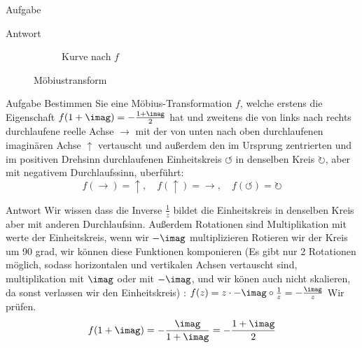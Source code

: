 \documentclass{scrartcl}
\let\*\cdot
\begin{document}
\begin{section}{Aufgabe}
\begin{subsection}{Antwort}
\begin{itemize}
\begin{figure}[H]
\begin{subfigure}{.47\textwidth}
\begin{tikzpicture}[x=2cm,y=2cm]
\end{tikzpicture}
  \caption{Kurve nach $f$}
\end{subfigure}
\caption{Möbiustransform}
\end{figure}





\end{itemize}
\end{subsection}
\end{section}
\begin{section}{Aufgabe}%
    Bestimmen Sie eine Möbius-Transformation $f$, welche erstens die Eigenschaft $f(1 + \imag) = -\frac{1+\imag}{2}$
hat und zweitens die von links nach rechts durchlaufene reelle Achse $\rightarrow$ mit der von unten nach oben durchlaufenen imaginären Achse $\uparrow$ vertauscht und außerdem den im
Ursprung zentrierten und im positiven Drehsinn durchlaufenen Einheitskreis $\circlearrowleft$ in denselben Kreis $\circlearrowright$, aber mit negativem Durchlaufssinn, uberführt: 
\[f(\rightarrow)=\uparrow,\quad f(\uparrow)=\rightarrow,\quad f(\circlearrowleft)=\circlearrowright\]
\end{section}
\begin{subsection}{Antwort}
    Wir wissen dass die Inverse $\frac{1}{z}$ bildet die Einheitskreis in denselben Kreis aber mit anderen Durchlaufsinn. Außerdem Rotationen sind Multiplikation mit werte der Einheitskreis, wenn wir $-\imag$ multiplizieren Rotieren wir der Kreis um 90 grad, wir können diese Funktionen komponieren (Es gibt nur 2 Rotationen möglich, sodass horizontalen und vertikalen Achsen vertauscht sind, multiplikation mit $\imag$ oder mit $-\imag$, und wir könen auch nicht skalieren, da sonst verlassen wir den Einheitskreis) :
    $f(z)=z\*-\imag\circ \frac{1}{z}=-\frac{\imag}{z}$
    Wir prüfen.
    \[f(1+\imag)=-\frac{\imag}{1+\imag}=-\frac{1+\imag}{2}\]
\end{subsection}
\end{document}
